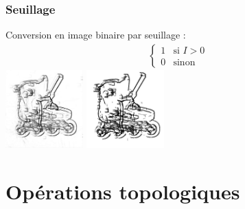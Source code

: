 \documentclass[french]{beamer}
\begin{document}
\begin{frame}
	\frametitle{Seuillage}
	Conversion en image binaire par seuillage :
	\begin{align}
		\begin{cases}
			1 & \text{si } I>0 \\
			0 & \text{sinon}
		\end{cases}
	\end{align}
	\bigskip
	\includegraphics[width=3cm]{images/roller_resn.jpg} \; \includegraphics[width=3cm]{images/roller_binn.jpg}
\end{frame}

\section{Opérations topologiques}
\end{document}
